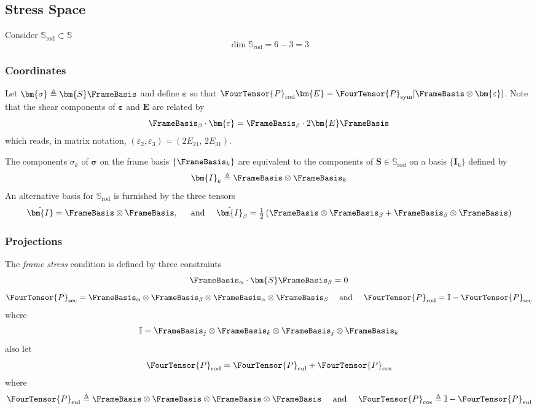 \subsection{Stress Space}\label{stress-space}

Consider \(\mathbb{S}_{\mathrm{rod}}\subset \mathbb{S}\) 
\[
\operatorname{dim}\mathbb{S}_{\mathrm{rod}} = 6 - 3 = 3
\]

\subsubsection{Coordinates}\label{coordinates}

Let \(\bm{\sigma} \triangleq \bm{S}\FrameBasis\) and define
\(\bm{\varepsilon}\) so that
\(\FourTensor{P}_{\mathrm{rod}}\bm{E} = \FourTensor{P}_{\mathrm{sym}}[\FrameBasis \otimes\bm{\varepsilon}]\).
Note that the shear components of \(\bm{\varepsilon}\) and \(\bm{E}\)
are related by 
\[
\FrameBasis_{\beta}\cdot\bm{\varepsilon} = \FrameBasis_{\beta} \cdot 2\bm{E}\FrameBasis
\] 
which reads, in matrix notation,
\((\varepsilon_2, \varepsilon_3) = (2E_{21},\, 2E_{31})\).

The components \(\sigma_k\) of \(\bm{\sigma}\) on the frame basis
\(\{\FrameBasis_k\}\) are equivalent to the components of
\(\bm{S}\in\mathbb{S}_{\mathrm{rod}}\) on a basis \(\{\bm{I}_k\}\)
defined by \[
\bm{I}_k \triangleq \FrameBasis\otimes\FrameBasis_k
\]
%
An alternative basis for \(\mathbb{S}_{\mathrm{rod}}\) is furnished by
the three tensors 
\[
\hat{\bm{I}} = \FrameBasis \otimes \FrameBasis,\, 
\quad\text{ and }\quad 
\hat{\bm{I}}_{\beta} = \tfrac{1}{2}\left(\FrameBasis \otimes\FrameBasis_{\beta} + \FrameBasis_{\beta}\otimes\FrameBasis\right)
\]

\subsubsection{Projections}\label{projections}

The \emph{frame stress} condition is defined by three constraints 
\[
\FrameBasis_{\alpha}\cdot\bm{S}\FrameBasis_{\beta} = 0
\]
\[
\FourTensor{P}_{\mathrm{sec}} = \FrameBasis_{\alpha}\otimes\FrameBasis_{\beta}\otimes\FrameBasis_{\alpha}\otimes\FrameBasis_{\beta}
\quad\text{ and }\quad
\FourTensor{P}_{\mathrm{rod}} = \mathbb{I} - \FourTensor{P}_{\mathrm{sec}}
\]
where 
\[
\mathbb{I} = \FrameBasis_j\otimes\FrameBasis_k \otimes \FrameBasis_j \otimes \FrameBasis_k 
\]
also let 
\[
\FourTensor{P}_{\mathrm{rod}} = \FourTensor{P}_{\mathrm{eul}} + \FourTensor{P}_{\mathrm{cos}}
\]
where 
\[
\FourTensor{P}_{\mathrm{eul}}\triangleq \FrameBasis\otimes\FrameBasis\otimes\FrameBasis\otimes\FrameBasis
\quad\text{ and }\quad 
\FourTensor{P}_{\mathrm{cos}} \triangleq \mathbb{I} - \FourTensor{P}_{\mathrm{eul}}
\]

